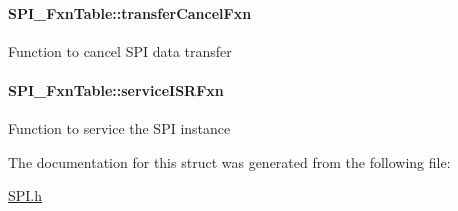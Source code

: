 \paragraph[{transfer\+Cancel\+Fxn}]{ S\+P\+I\+\_\+\+Fxn\+Table\+::transfer\+Cancel\+Fxn}\label{struct_s_p_i___fxn_table_a50f7f21536780c912dedf32c0918034c}
Function to cancel S\+P\+I data transfer 
\paragraph[{service\+I\+S\+R\+Fxn}]{ S\+P\+I\+\_\+\+Fxn\+Table\+::service\+I\+S\+R\+Fxn}\label{struct_s_p_i___fxn_table_a258c209814c001c5033463a2cb9cb9dd}
Function to service the S\+P\+I instance 

The documentation for this struct was generated from the following file\+:\begin{DoxyCompactItemize}
\item 
\hyperlink{_s_p_i_8h}{S\+P\+I.\+h}\end{DoxyCompactItemize}
